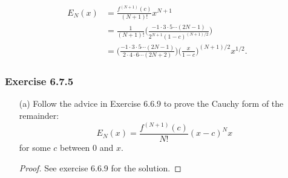 \begin{align*}
   E_{N}(x)  &= \frac{ f^{(N+1)}(c)  }{ (N+1)! } x^{N+1}  \\
             &= \frac{ 1 }{ (N+1)! } \Big( \frac{ -1 \cdot 3 \cdot 5 \dotsb (2N-1) }{ 2^{N+1} (1-c)^{(N+1)/2} }  \Big) \\
             &= \Big( \frac{ -1 \cdot 3 \cdot 5 \dotsb (2N-1) }{ 2 \cdot 4 \cdot 6 \dotsb (2N+2) }  \Big) \Big( \frac{ x  }{ 1 -c  }  \Big)^{(N+1)/2} x^{1/2}.
\end{align*}

\subsubsection{Exercise 6.7.5} 
\begin{enumerate}
    \item[(a)] Follow the advice in Exercise 6.6.9 to prove the Cauchy form of the remainder:
        \[ E_{N}(x) = \frac{ f^{(N+1)}(c)  }{ N! } (x-c)^{N}x \]
        for some \( c  \) between \( 0  \) and \( x  \).
        \begin{proof}
        See exercise 6.6.9 for the solution.
        \end{proof}


\end{enumerate}
